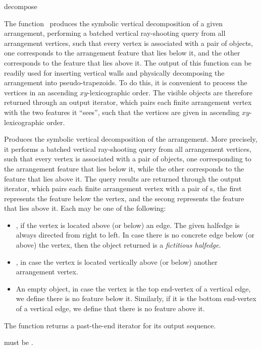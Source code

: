 \ccRefPageBegin

\begin{ccRefFunction}{decompose}

\ccDefinition

The function \ccRefName\ produces the symbolic vertical decomposition of a
given arrangement, performing a batched vertical ray-shooting query from
all arrangement vertices, such that every vertex is associated with a pair
of objects, one corresponds to the arrangement feature that lies below it,
and the other corresponds to the feature that lies above it.
The output of this function can be readily used for inserting vertical walls
and physically decomposing the arrangement into pseudo-trapezoids. To do
this, it is convenient to process the vertices in an ascending
$xy$-lexicographic order. The visible objects are therefore returned through
an output iterator, which pairs each finite arrangement vertex with the two
features it ``sees'', such that the vertices are given in ascending
$xy$-lexicographic order. 



Produces the symbolic vertical decomposition of the  arrangement.
More precisely, it performs a batched vertical ray-shooting query from all
arrangement vertices, such that every vertex is associated with a pair of
objects, one corresponding to the arrangement feature that lies below it,
while the other corresponds to the feature that lies above it. 
The query results are returned through the output iterator, which pairs
each finite arrangement vertex with a pair of s, the first
represents the feature below the vertex, and the secong represents the
feature that lies above it. Each  may be one of the following:
\begin{itemize}
\item {}, if the vertex is located above (or
  below) an edge. The given halfedge is always directed from right to left.
  In case there is no concrete edge below (or above) the vertex, then
  the object returned is a {\em fictitious halfedge}.
\item {}, in case the vertex is located vertically
  above (or below) another arrangement vertex.
\item An empty object, in case the vertex is the top end-vertex of
  a vertical edge, we define there is no feature below it. Similarly, if
  it is the bottom end-vertex of a vertical edge, we define that there
  is no feature above it.
\end{itemize}
The function returns a past-the-end iterator for its output sequence.

 must be
  .

\end{ccRefFunction}

\ccRefPageEnd
